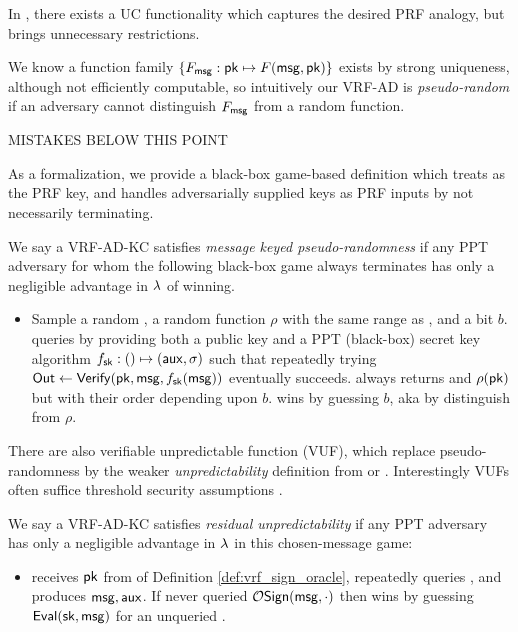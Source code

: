 In \cite{praos}, there exists a UC functionality which captures the
desired PRF analogy, but brings unnecessary restrictions.

We know a function family $\{ F_\mathsf{msg} : \mathsf{pk} \mapsto F(\mathsf{msg},\mathsf{pk}) \}$ exists
by strong uniqueness, although not efficiently computable, so intuitively
our VRF-AD is {\em pseudo-random} if an adversary cannot distinguish
$F_\mathsf{msg}$ from a random function.

\bigskip

MISTAKES BELOW THIS POINT

\bigskip 

As a formalization, we provide a black-box game-based definition which
treats \msg as the PRF key, and handles adversarially supplied keys as
PRF inputs by not necessarily terminating.

\begin{definition}
We say a VRF-AD-KC satisfies {\em message keyed pseudo-randomness} if 
any PPT adversary \adv for whom the following black-box game always
terminates has only a negligible advantage in $\lambda$ of winning.
\begin{itemize}
	\item[]
	Sample a random \msg, a random function $\rho$ with the same range as \Eval, and a bit $b$.
	\adv queries  by providing both a public key \pk and
	a PPT (black-box) secret key algorithm $f_\mathsf{sk} : () \mapsto (\mathsf{aux},\sigma)$
	such that repeatedly trying ${\mathsf{Out}} \leftarrow {\ensuremath{\mathsf{Verify}}}(\mathsf{pk},\mathsf{msg},f_\mathsf{sk}(\mathsf{msg}))$
	eventually succeeds.
	 always returns \Out and $\rho(\mathsf{pk})$ but with their order depending upon $b$.
	\adv wins by guessing $b$, aka by distinguish \Verify from $\rho$.
\end{itemize}
\end{definition}

There are also verifiable unpredictable function (VUF), which replace
pseudo-randomness by the weaker {\em unpredictability} definition from
\cite[Def. VUF (3) \S3.2, pp. 5]{vrf_micali} or \cite[Def. 4, pp. 8]{agg_dgk}.
Interestingly VUFs often suffice threshold security assumptions \cite{agg_dkg}.

\begin{definition}
We say a VRF-AD-KC satisfies {\em residual unpredictability} if 
any PPT adversary \adv has only a negligible advantage in $\lambda$
in this chosen-message game:
\begin{itemize}
	\item[]
	\adv receives $\mathsf{pk}$ from  of Definition \ref{def:vrf_sign_oracle},
    repeatedly queries , and produces $\mathsf{msg},\mathsf{aux}$.
    If \adv never queried $\mathcal{O}\mathsf{Sign}(\mathsf{msg},\cdot)$ then
    \adv wins by guessing ${\mathsf{Eval}}(\mathsf{sk},\mathsf{msg})$ for an unqueried \msg.
\end{itemize}
\end{definition}

